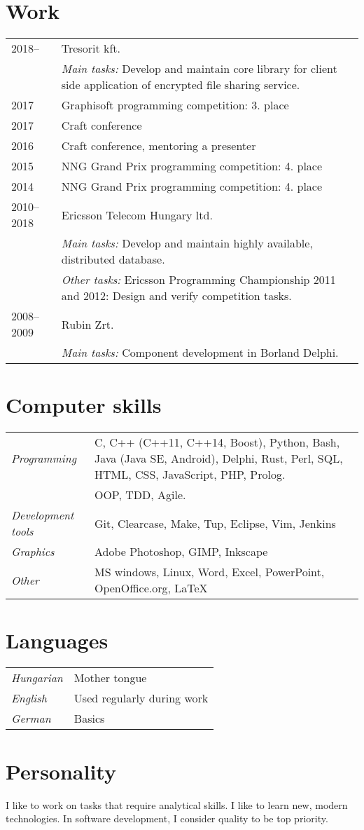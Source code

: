 \documentclass[a4paper,10pt]{article}
\newcommand{\pont}[1]{\emph{#1}}
\begin{document}
\section*{Work}
\begin{tabular}{lp{10cm}}
 2018--&Tresorit kft.\\
  &\emph{Main tasks:} Develop and maintain core library for client side application of encrypted file sharing service.\\
 2017&Graphisoft programming competition: 3. place\\
 2017&Craft conference\\
 2016&Craft conference, mentoring a presenter\\
 2015&NNG Grand Prix programming competition: 4. place\\
 2014&NNG Grand Prix programming competition: 4. place\\
 2010--2018&Ericsson Telecom Hungary ltd.\\
  &\emph{Main tasks:} Develop and maintain highly available, distributed database.\\
  &\emph{Other tasks:} Ericsson Programming Championship 2011 and 2012: Design and verify competition tasks.\\
 2008--2009&Rubin Zrt.\\
  &\emph{Main tasks:} Component development in Borland Delphi.
\end{tabular}

\section*{Computer skills}
\begin{tabular}{lp{12cm}}
 \pont{Programming}&C, C++ (C++11, C++14, Boost), Python, Bash, Java (Java SE, Android), Delphi, Rust, Perl, SQL, HTML, CSS, JavaScript, PHP, Prolog.\\
 &OOP, TDD, Agile.\\
 \pont{Development tools}&Git, Clearcase, Make, Tup, Eclipse, Vim, Jenkins\\
 \pont{Graphics}&Adobe Photoshop, GIMP, Inkscape\\
 \pont{Other}&MS windows, Linux, Word, Excel, PowerPoint, OpenOffice.org, LaTeX
\end{tabular}

\section*{Languages}
\begin{tabular}{ll}
 \pont{Hungarian}&Mother tongue\\
 \pont{English}&Used regularly during work\\
 \pont{German}&Basics
\end{tabular}

\section*{Personality}
I like to work on tasks that require analytical skills. I like to learn new, modern technologies. In software development, I consider quality to be top priority.
\end{document}
